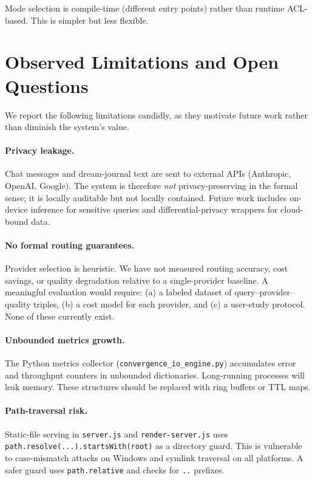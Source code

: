 \documentclass{article}
\begin{document}
Mode selection is compile-time (different entry points) rather than runtime
ACL-based. This is simpler but less flexible.

\section{Observed Limitations and Open Questions}

We report the following limitations candidly, as they motivate future work
rather than diminish the system's value.

\paragraph{Privacy leakage.} Chat messages and dream-journal text are sent to
external APIs (Anthropic, OpenAI, Google). The system is therefore \emph{not}
privacy-preserving in the formal sense; it is locally auditable but not
locally contained. Future work includes on-device inference for sensitive
queries and differential-privacy wrappers for cloud-bound data.

\paragraph{No formal routing guarantees.} Provider selection is heuristic. We
have not measured routing accuracy, cost savings, or quality degradation
relative to a single-provider baseline. A meaningful evaluation would require:
(a) a labeled dataset of query--provider--quality triples, (b) a cost model for
each provider, and (c) a user-study protocol. None of these currently exist.

\paragraph{Unbounded metrics growth.} The Python metrics collector
(\texttt{convergence\_io\_engine.py}) accumulates error and throughput counters
in unbounded dictionaries. Long-running processes will leak memory. These
structures should be replaced with ring buffers or TTL maps.

\paragraph{Path-traversal risk.} Static-file serving in
\texttt{server.js} and \texttt{render-server.js} uses
\texttt{path.resolve(...).startsWith(root)} as a directory guard. This is
vulnerable to case-mismatch attacks on Windows and symlink traversal on all
platforms. A safer guard uses \texttt{path.relative} and checks for
\texttt{..} prefixes.
\end{document}
